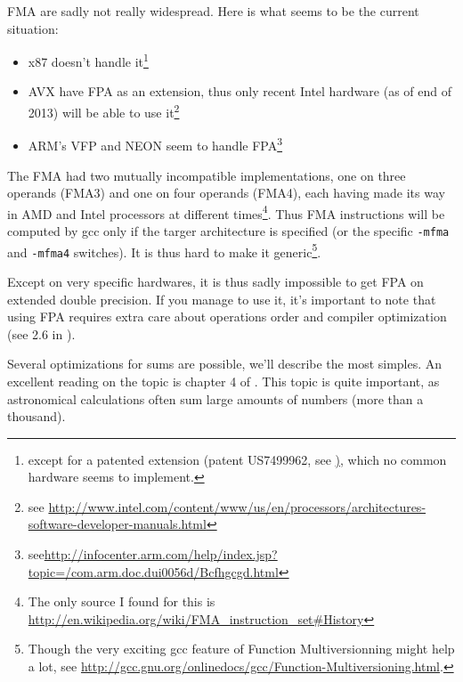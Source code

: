 
FMA are sadly not really widespread. Here is what seems to be the current situation:
\begin{itemize}
\item x87 doesn't handle it\footnote{except for a patented extension (patent US7499962, see \href{http://www.google.com/patents/US7499962}), which no common hardware seems to implement.}
\item AVX have FPA as an extension, thus only recent Intel hardware (as of end of 2013) will be able to use it\footnote{see \url{http://www.intel.com/content/www/us/en/processors/architectures-software-developer-manuals.html}\TODO}
\item ARM's VFP and NEON seem to handle FPA\footnote{see\url{http://infocenter.arm.com/help/index.jsp?topic=/com.arm.doc.dui0056d/Bcfhgcgd.html}}
\end{itemize}

The FMA had two mutually incompatible implementations, one on three operands (FMA3) and one on four operands (FMA4), each having made its way in AMD and Intel processors at different times\footnote{The only source I found for this is \url{http://en.wikipedia.org/wiki/FMA\_instruction\_set\#History}}. Thus FMA instructions will be computed by gcc only if the targer architecture is specified (or the specific \texttt{-mfma} and \texttt{-mfma4} switches). It is thus hard to make it generic\footnote{Though the very exciting gcc feature of Function Multiversionning might help a lot, see \url{http://gcc.gnu.org/onlinedocs/gcc/Function-Multiversioning.html}.}.


Except on very specific hardwares, it is thus sadly impossible to get FPA on extended double precision. If you manage to use it, it's important to note that using FPA requires extra care about operations order and compiler optimization (see 2.6 in \cite{Higham}).


Several optimizations for sums are possible, we'll describe the most simples. An excellent reading on the topic is chapter 4 of \cite{Higham}. This topic is quite important, as astronomical calculations often sum large amounts of numbers (more than a thousand).


